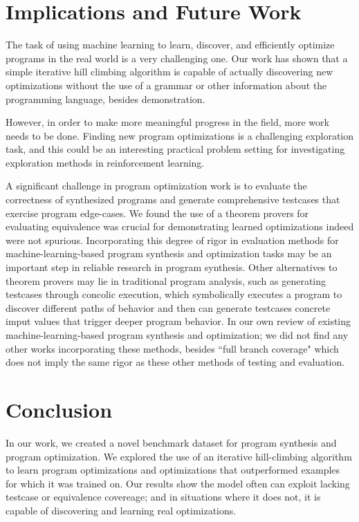 \documentclass{article}
\begin{document}
\section{Implications and Future Work}

The task of using machine learning to learn, discover, and efficiently optimize programs in the real world is a very challenging one. Our work has shown that a simple iterative hill climbing algorithm is capable of actually discovering new optimizations without the use of a grammar or other information about the programming language, besides demonstration. 

However, in order to make more meaningful progress in the field, more work needs to be done. Finding new program optimizations is a challenging exploration task, and this could be an interesting practical problem setting for investigating exploration methods in reinforcement learning. 

A significant challenge in program optimization work is to evaluate the correctness of synthesized programs and generate comprehensive testcases that exercise program edge-cases. We found the use of a theorem provers for evaluating equivalence was crucial for demonstrating learned optimizations indeed were not spurious. Incorporating this degree of rigor in evaluation methods for machine-learning-based program synthesis and optimization tasks may be an important step in reliable research in program synthesis. Other alternatives to theorem provers may lie in traditional program analysis, such as generating testcases through concolic execution, which symbolically executes a program to discover different paths of behavior and then can generate testcases concrete imput values that trigger deeper program behavior. In our own review of existing machine-learning-based program synthesis and optimization; we did not find any other works incorporating these methods, besides ``full branch coverage" which does not imply the same rigor as these other methods of testing and evaluation. 


\section{Conclusion}

In our work, we created a novel benchmark dataset for program synthesis and program optimization. We explored the use of an iterative hill-climbing algorithm to learn program optimizations and optimizations that outperformed examples for which it was trained on. Our results show the model often can exploit lacking testcase or equivalence covereage; and in situations where it does not, it is capable of discovering and learning real optimizations. 
\end{document}
